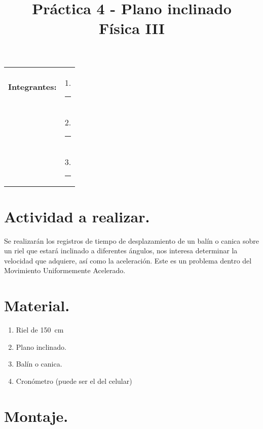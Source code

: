 \documentclass[14pt]{extarticle}
\title{\vspace*{-2cm} Práctica 4 - Plano inclinado \\  Física III\vspace{-5ex}}
\date{}
\begin{document}
\maketitle

\begin{table}[H]
\begin{tabular}{l l}
\textbf{Integrantes:} & 1. \rule{8cm}{0.1mm} \\
 & 2. \rule{8cm}{0.1mm} \\
 & 3. \rule{8cm}{0.1mm} \\
\end{tabular}
\end{table}

\section{Actividad a realizar.}

Se realizarán los registros de tiempo de desplazamiento de un balín o canica sobre un riel que estará inclinado a diferentes ángulos, nos interesa determinar la velocidad que adquiere, así como la aceleración. Este es un problema dentro del Movimiento Uniformemente Acelerado.

\section{Material.}

\begin{enumerate}
\item Riel de \SI{150}{\centi\meter}
\item Plano inclinado.
\item Balín o canica.
\item Cronómetro (puede ser el del celular)
\end{enumerate}

\section{Montaje.}
\end{document}
